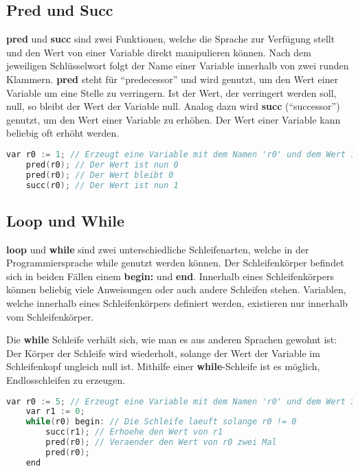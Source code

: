 \subsection{Pred und Succ} \label{subsec:while-konzepte-pred}
\textbf{pred} und \textbf{succ} sind zwei Funktionen, welche die Sprache zur Verfügung stellt und den Wert von einer Variable direkt manipulieren können. Nach dem jeweiligen Schlüsselwort folgt der Name einer Variable innerhalb von zwei runden Klammern. \textbf{pred} steht für \enquote{predecessor} und wird genutzt, um den Wert einer Variable um eine Stelle zu verringern. Ist der Wert, der verringert werden soll, null, so bleibt der Wert der Variable null. Analog dazu wird \textbf{succ} (\enquote{successor}) genutzt, um den Wert einer Variable zu erhöhen. Der Wert einer Variable kann beliebig oft erhöht werden.

\begin{lstlisting}[language=c, caption=pred und succ in While, label={lst:while-pred-succ}]
	var r0 := 1; // Erzeugt eine Variable mit dem Namen 'r0' und dem Wert 1
	pred(r0); // Der Wert ist nun 0
	pred(r0); // Der Wert bleibt 0
	succ(r0); // Der Wert ist nun 1
\end{lstlisting}

\subsection{Loop und While}
\textbf{loop} und \textbf{while} sind zwei unterschiedliche Schleifenarten, welche in der Programmiersprache while genutzt werden können. Der Schleifenkörper befindet sich in beiden Fällen einem \textbf{begin:} und \textbf{end}. Innerhalb eines Schleifenkörpers können beliebig viele Anweisungen oder auch andere Schleifen stehen. Variablen, welche innerhalb eines Schleifenkörpers definiert werden, existieren nur innerhalb vom Schleifenkörper.

Die \textbf{while} Schleife verhält sich, wie man es aus anderen Sprachen gewohnt ist: Der Körper der Schleife wird wiederholt, solange der Wert der Variable im Schleifenkopf ungleich null ist. Mithilfe einer \textbf{while}-Schleife ist es möglich, Endlosschleifen zu erzeugen.

\begin{lstlisting}[language=c, caption=while-Schleife in While, label={lst:while-while}]
	var r0 := 5; // Erzeugt eine Variable mit dem Namen 'r0' und dem Wert 3
	var r1 := 0;
	while(r0) begin: // Die Schleife laeuft solange r0 != 0
		succ(r1); // Erhoehe den Wert von r1
		pred(r0); // Veraender den Wert von r0 zwei Mal
		pred(r0);
	end
\end{lstlisting}

